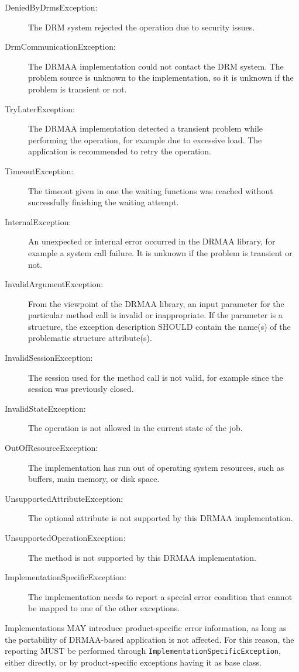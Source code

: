 \documentclass{article}
\newcommand{\h}[1]{\lstinline|#1|}
\begin{document}
\begin{description}	
\item[DeniedByDrmsException:] The DRM system rejected the operation due to security issues.
\item[DrmCommunicationException:] The DRMAA implementation could not contact the DRM system. The problem source is unknown to the implementation, so it is unknown if the problem is transient or not.
\item[TryLaterException:] The DRMAA implementation detected a transient problem while performing the operation, for example due to excessive load. The application is recommended to retry the operation.
\item[TimeoutException:] The timeout given in one the waiting functions was reached without successfully finishing the waiting attempt.
\item[InternalException:] An unexpected or internal error occurred in the DRMAA library, for example a system call failure. It is unknown if the problem is transient or not.
\item[InvalidArgumentException:] From the viewpoint of the DRMAA library, an input parameter for the particular method call is invalid or inappropriate. If the parameter is a structure, the exception description SHOULD contain the name(s) of the problematic structure attribute(s).
\item[InvalidSessionException:] The session used for the method call is not valid, for example since the session was previously closed.
\item[InvalidStateException:] The operation is not allowed in the current state of the job.
\item[OutOfResourceException:] The implementation has run out of operating system resources, such as buffers, main memory, or disk space.
\item[UnsupportedAttributeException:] The optional attribute is not supported by this DRMAA implementation.
\item[UnsupportedOperationException:] The method is not supported by this DRMAA implementation. 
\item[ImplementationSpecificException:] The implementation needs to report a special error condition that cannot be mapped to one of the other exceptions. 
\end{description}

Implementations MAY introduce product-specific error information, as long as the portability of DRMAA-based application is not affected. For this reason, the reporting MUST be performed through  \h{ImplementationSpecificException}, either directly, or by product-specific exceptions having it as base class.
\end{document}
